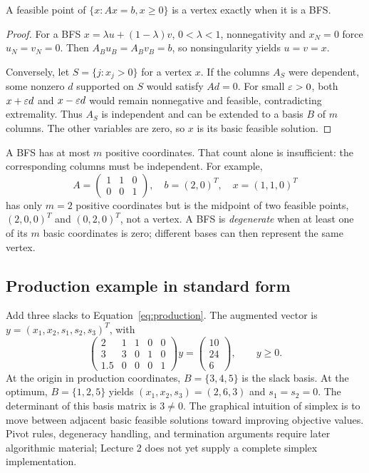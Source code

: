 \documentclass[11pt,a4paper]{article}
\begin{document}
\begin{theorem}\label{thm:bfs}
  A feasible point of $\{x:Ax=b,x\geq0\}$ is a vertex exactly when it is a BFS.
\end{theorem}
\begin{proof}
  For a BFS $x=\lambda u+(1-\lambda)v$, $0<\lambda<1$, nonnegativity and $x_N=0$
  force $u_N=v_N=0$. Then $A_Bu_B=A_Bv_B=b$, so nonsingularity yields $u=v=x$.

  Conversely, let $S=\{j:x_j>0\}$ for a vertex $x$. If the columns $A_S$ were
  dependent, some nonzero $d$ supported on $S$ would satisfy $Ad=0$.
  For small $\varepsilon>0$, both $x+\varepsilon d$ and $x-\varepsilon d$ would remain nonnegative
  and feasible, contradicting extremality. Thus $A_S$ is independent and can be
  extended to a basis $B$ of $m$ columns. The other variables are zero, so $x$ is
  its basic feasible solution.
\end{proof}
A BFS has at most $m$ positive coordinates. That count alone is insufficient:
the corresponding columns must be independent. For example,
\[
  A=\begin{pmatrix}1&1&0\\0&0&1\end{pmatrix},\quad b=(2,0)^T,
  \quad x=(1,1,0)^T
\]
has only $m=2$ positive coordinates but is the midpoint of two feasible points,
$(2,0,0)^T$ and $(0,2,0)^T$, not a vertex.
A BFS is \emph{degenerate} when at least one of its $m$ basic coordinates is zero;
different bases can then represent the same vertex.

\subsection{Production example in standard form}
Add three slacks to Equation~\ref{eq:production}. The augmented vector is
$y=(x_1,x_2,s_1,s_2,s_3)^T$, with
\[
  \begin{pmatrix}2&1&1&0&0\\3&3&0&1&0\\1.5&0&0&0&1\end{pmatrix}y
  =\begin{pmatrix}10\\24\\6\end{pmatrix},\qquad y\geq0.
\]
At the origin in production coordinates, $B=\{3,4,5\}$ is the slack basis.
At the optimum, $B=\{1,2,5\}$ yields $(x_1,x_2,s_3)=(2,6,3)$ and
$s_1=s_2=0$. The determinant of this basis matrix is $3\neq0$.
The graphical intuition of simplex is to move between adjacent basic feasible
solutions toward improving objective values. Pivot rules, degeneracy handling,
and termination arguments require later algorithmic material; Lecture 2 does
not yet supply a complete simplex implementation.
\end{document}
